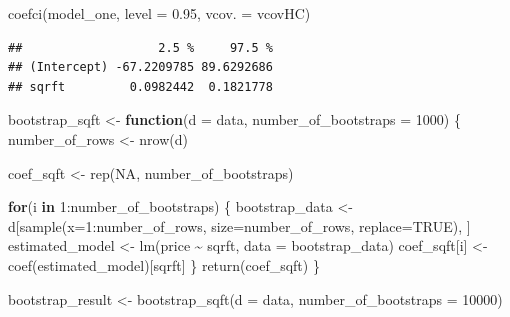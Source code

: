 \documentclass[
]{book}
\newenvironment{Shaded}{\begin{snugshade}}{\end{snugshade}}
\newcommand{\AttributeTok}[1]{\textcolor[rgb]{0.77,0.63,0.00}{#1}}
\newcommand{\ConstantTok}[1]{\textcolor[rgb]{0.00,0.00,0.00}{#1}}
\newcommand{\ControlFlowTok}[1]{\textcolor[rgb]{0.13,0.29,0.53}{\textbf{#1}}}
\newcommand{\DecValTok}[1]{\textcolor[rgb]{0.00,0.00,0.81}{#1}}
\newcommand{\FloatTok}[1]{\textcolor[rgb]{0.00,0.00,0.81}{#1}}
\newcommand{\FunctionTok}[1]{\textcolor[rgb]{0.00,0.00,0.00}{#1}}
\newcommand{\NormalTok}[1]{#1}
\newcommand{\OtherTok}[1]{\textcolor[rgb]{0.56,0.35,0.01}{#1}}
\newcommand{\SpecialCharTok}[1]{\textcolor[rgb]{0.00,0.00,0.00}{#1}}
\newcommand{\StringTok}[1]{\textcolor[rgb]{0.31,0.60,0.02}{#1}}
\theoremstyle{definition}
\theoremstyle{definition}
\theoremstyle{definition}
\theoremstyle{definition}
\theoremstyle{remark}
\begin{document}
\begin{Shaded}
\begin{Highlighting}[]
\FunctionTok{coefci}\NormalTok{(model\_one, }\AttributeTok{level =} \FloatTok{0.95}\NormalTok{, }\AttributeTok{vcov. =}\NormalTok{ vcovHC)}
\end{Highlighting}
\end{Shaded}

\begin{verbatim}
##                   2.5 %     97.5 %
## (Intercept) -67.2209785 89.6292686
## sqrft         0.0982442  0.1821778
\end{verbatim}

\begin{Shaded}
\begin{Highlighting}[]
\NormalTok{bootstrap\_sqft }\OtherTok{\textless{}{-}} \ControlFlowTok{function}\NormalTok{(}\AttributeTok{d =}\NormalTok{ data, }\AttributeTok{number\_of\_bootstraps =} \DecValTok{1000}\NormalTok{) \{ }
\NormalTok{  number\_of\_rows }\OtherTok{\textless{}{-}} \FunctionTok{nrow}\NormalTok{(d)}

\NormalTok{    coef\_sqft }\OtherTok{\textless{}{-}} \FunctionTok{rep}\NormalTok{(}\ConstantTok{NA}\NormalTok{, number\_of\_bootstraps)}

    \ControlFlowTok{for}\NormalTok{(i }\ControlFlowTok{in} \DecValTok{1}\SpecialCharTok{:}\NormalTok{number\_of\_bootstraps) \{ }
\NormalTok{      bootstrap\_data }\OtherTok{\textless{}{-}}\NormalTok{ d[}\FunctionTok{sample}\NormalTok{(}\AttributeTok{x=}\DecValTok{1}\SpecialCharTok{:}\NormalTok{number\_of\_rows, }\AttributeTok{size=}\NormalTok{number\_of\_rows, }\AttributeTok{replace=}\ConstantTok{TRUE}\NormalTok{), ]  }
\NormalTok{      estimated\_model }\OtherTok{\textless{}{-}} \FunctionTok{lm}\NormalTok{(price }\SpecialCharTok{\textasciitilde{}}\NormalTok{ sqrft, }\AttributeTok{data =}\NormalTok{ bootstrap\_data)}
\NormalTok{      coef\_sqft[i]    }\OtherTok{\textless{}{-}} \FunctionTok{coef}\NormalTok{(estimated\_model)[}\StringTok{\textquotesingle{}sqrft\textquotesingle{}}\NormalTok{]}
\NormalTok{    \}}
  \FunctionTok{return}\NormalTok{(coef\_sqft)}
\NormalTok{\}}
\end{Highlighting}
\end{Shaded}

\begin{Shaded}
\begin{Highlighting}[]
\NormalTok{bootstrap\_result }\OtherTok{\textless{}{-}} \FunctionTok{bootstrap\_sqft}\NormalTok{(}\AttributeTok{d =}\NormalTok{ data, }\AttributeTok{number\_of\_bootstraps =} \DecValTok{10000}\NormalTok{)}
\end{Highlighting}
\end{Shaded}
\end{document}
